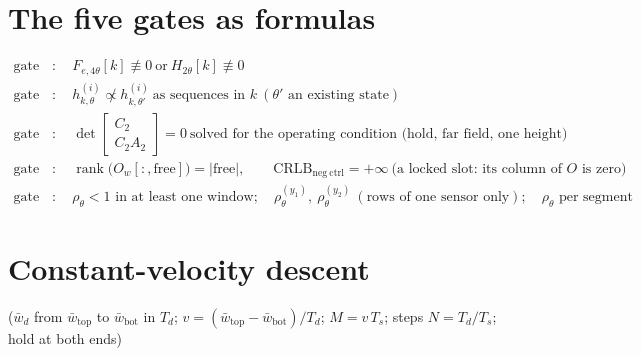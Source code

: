 \documentclass[11pt,a4paper,fontset=none]{ctexart}
\newcommand{\bw}{\bar{w}}
\begin{document}
\section{The five gates as formulas}

\begin{align*}
\text{gate 1} &: \quad F_{e,4\theta}[k] \not\equiv 0 \ \text{or}\ H_{2\theta}[k] \not\equiv 0 \\
\text{gate 2} &: \quad h^{(i)}_{k,\theta} \not\propto h^{(i)}_{k,\theta'} \ \text{as sequences in } k \ (\theta' \text{ an existing state}) \\
\text{gate 3} &: \quad \det\begin{bmatrix} C_2 \\ C_2A_2 \end{bmatrix} = 0 \ \text{solved for the operating condition (hold, far field, one height)} \\
\text{gate 4} &: \quad \operatorname{rank}\bigl(O_w[:,\mathrm{free}]\bigr) = |\mathrm{free}|, \qquad
                 \mathrm{CRLB}_{\mathrm{neg\ ctrl}} = +\infty \ \text{(a locked slot: its column of } O \text{ is zero)} \\
\text{gate 5} &: \quad \rho_\theta < 1 \text{ in at least one window}; \quad
                 \rho_\theta^{(y_1)},\ \rho_\theta^{(y_2)} \ (\text{rows of one sensor only});\quad \rho_\theta \text{ per segment}
\end{align*}

\section{Constant-velocity descent}

($\bw_d$ from $\bw_{\mathrm{top}}$ to $\bw_{\mathrm{bot}}$ in $T_d$; $v = (\bw_{\mathrm{top}} - \bw_{\mathrm{bot}})/T_d$; $M = v\,T_s$; steps $N = T_d/T_s$; hold at both ends)
\end{document}
